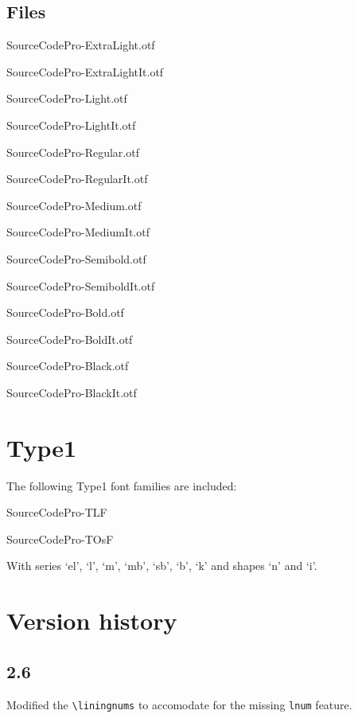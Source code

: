 \documentclass[10pt,a4paper,english]{article}
\begin{document}
\begin{multicols}{2}
\subsection{Files}
\begin{itemize*}
	\item SourceCodePro-ExtraLight.otf
	\item SourceCodePro-ExtraLightIt.otf
	\item SourceCodePro-Light.otf
	\item SourceCodePro-LightIt.otf
	\item SourceCodePro-Regular.otf
	\item SourceCodePro-RegularIt.otf
	\item SourceCodePro-Medium.otf
	\item SourceCodePro-MediumIt.otf	
	\item SourceCodePro-Semibold.otf
	\item SourceCodePro-SemiboldIt.otf
	\item SourceCodePro-Bold.otf
	\item SourceCodePro-BoldIt.otf
	\item SourceCodePro-Black.otf
	\item SourceCodePro-BlackIt.otf
\end{itemize*}

\section{Type1}
The following Type1 font families are included:
\begin{itemize*}
	\item SourceCodePro-TLF
	\item SourceCodePro-TOsF
\end{itemize*}
With series ‘el’, ‘l’, ‘m’, ‘mb’, ‘sb’, ‘b’, ‘k’ and shapes ‘n’ and ‘i’.

\section{Version history}
\subsection*{2.6}
\begin{itemize*}
	\item Modified the \texttt{\textbackslash liningnums} to accomodate for the missing \texttt{lnum} feature.
\end{itemize*}


\end{multicols}
\end{document}
